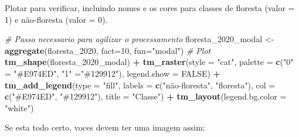 \documentclass[
]{article}
\newenvironment{Shaded}{\begin{snugshade}}{\end{snugshade}}
\newcommand{\AttributeTok}[1]{\textcolor[rgb]{0.13,0.29,0.53}{#1}}
\newcommand{\CommentTok}[1]{\textcolor[rgb]{0.56,0.35,0.01}{\textit{#1}}}
\newcommand{\ConstantTok}[1]{\textcolor[rgb]{0.56,0.35,0.01}{#1}}
\newcommand{\DecValTok}[1]{\textcolor[rgb]{0.00,0.00,0.81}{#1}}
\newcommand{\FunctionTok}[1]{\textcolor[rgb]{0.13,0.29,0.53}{\textbf{#1}}}
\newcommand{\NormalTok}[1]{#1}
\newcommand{\OtherTok}[1]{\textcolor[rgb]{0.56,0.35,0.01}{#1}}
\newcommand{\SpecialCharTok}[1]{\textcolor[rgb]{0.81,0.36,0.00}{\textbf{#1}}}
\newcommand{\StringTok}[1]{\textcolor[rgb]{0.31,0.60,0.02}{#1}}
\begin{document}
\newpage

Plotar para verificar, incluindo nomes e os cores para classes de floresta (valor = 1) e não-floresta (valor = 0).

\begin{Shaded}
\begin{Highlighting}[]
\CommentTok{\# Passo necessario para agilizar o processamento}
\NormalTok{floresta\_2020\_modal }\OtherTok{\textless{}{-}} \FunctionTok{aggregate}\NormalTok{(floresta\_2020, }
                                 \AttributeTok{fact=}\DecValTok{10}\NormalTok{, }
                                 \AttributeTok{fun=}\StringTok{"modal"}\NormalTok{)}
\CommentTok{\# Plot}
\FunctionTok{tm\_shape}\NormalTok{(floresta\_2020\_modal) }\SpecialCharTok{+}
  \FunctionTok{tm\_raster}\NormalTok{(}\AttributeTok{style =} \StringTok{"cat"}\NormalTok{, }
            \AttributeTok{palette =} \FunctionTok{c}\NormalTok{(}\StringTok{"0"} \OtherTok{=} \StringTok{"\#E974ED"}\NormalTok{, }\StringTok{"1"} \OtherTok{=}\StringTok{"\#129912"}\NormalTok{), }\AttributeTok{legend.show =} \ConstantTok{FALSE}\NormalTok{) }\SpecialCharTok{+} 
  \FunctionTok{tm\_add\_legend}\NormalTok{(}\AttributeTok{type =} \StringTok{"fill"}\NormalTok{, }\AttributeTok{labels =} \FunctionTok{c}\NormalTok{(}\StringTok{"não{-}floresta"}\NormalTok{, }\StringTok{"floresta"}\NormalTok{),}
    \AttributeTok{col =} \FunctionTok{c}\NormalTok{(}\StringTok{"\#E974ED"}\NormalTok{, }\StringTok{"\#129912"}\NormalTok{), }\AttributeTok{title =} \StringTok{"Classe"}\NormalTok{) }\SpecialCharTok{+} 
\FunctionTok{tm\_layout}\NormalTok{(}\AttributeTok{legend.bg.color =} \StringTok{"white"}\NormalTok{)}
\end{Highlighting}
\end{Shaded}

Se esta todo certo, voces devem ter uma imagem assim:
\end{document}
